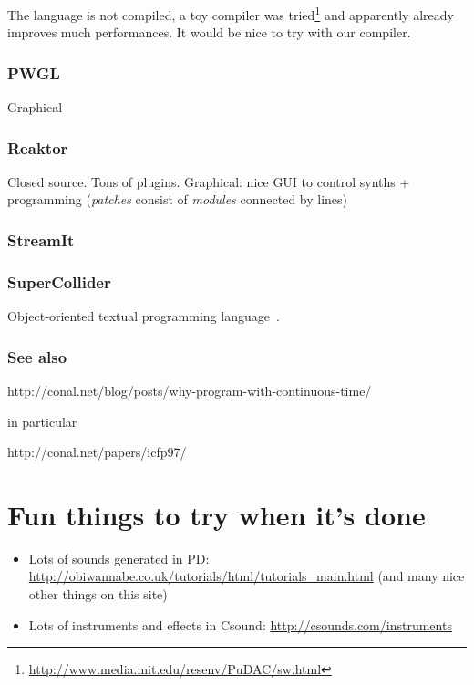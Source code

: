 \documentclass[a4paper,titlepage]{article}
\begin{document}
The language is not compiled, a toy compiler was
tried\footnote{\url{http://www.media.mit.edu/resenv/PuDAC/sw.html}} and
apparently already improves much performances. It would be nice to try with our compiler.

\subsubsection{PWGL}
\cite{pwgl}
Graphical

\subsubsection{Reaktor}
\cite{reaktor} Closed source. Tons of plugins. Graphical: nice GUI to control
synths + programming (\emph{patches} consist of \emph{modules} connected by
lines)

\subsubsection{StreamIt}
\cite{streamit}

\subsubsection{SuperCollider}
Object-oriented textual programming language~\cite{supercollider}.

\subsubsection{See also}
http://conal.net/blog/posts/why-program-with-continuous-time/

in particular

http://conal.net/papers/icfp97/

\section{Fun things to try when it's done}
\begin{itemize}
\item Lots of sounds generated in PD:
  \url{http://obiwannabe.co.uk/tutorials/html/tutorials_main.html}
  (and many nice other things on this site)
\item Lots of instruments and effects in Csound:
  \url{http://csounds.com/instruments}
\end{itemize}



\end{document}
